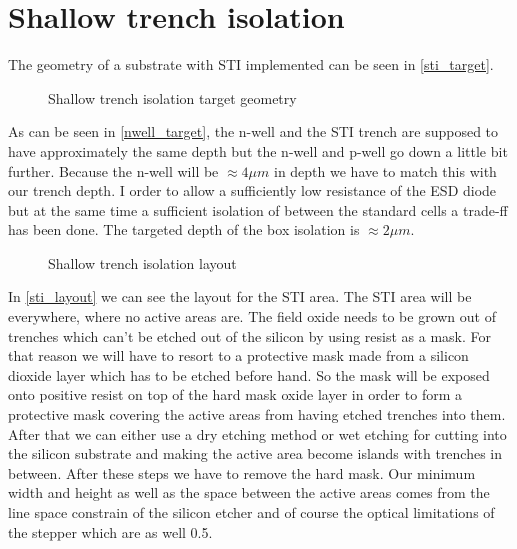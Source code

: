 \section{Shallow trench isolation}\label{sti_chapter}
The geometry of a substrate with STI implemented can be seen in \autoref{sti_target}.

\begin{figure}[H]
	\centering
	\begin{tikzpicture}[node distance = 3cm, auto, thick,scale=\CrossAndTopSectionBig, every node/.style={transform shape}]
		
	\end{tikzpicture}
	\begin{tikzpicture}[node distance = 3cm, auto, thick,scale=\CrossAndTopSectionBig, every node/.style={transform shape}]
		
	\end{tikzpicture}
	\caption{Shallow trench isolation target geometry}
	\label{sti_target}
\end{figure}

As can be seen in \autoref{nwell_target}, the n-well and the STI trench are supposed to have approximately the same depth but the n-well and p-well go down a little bit further.
Because the n-well will be $\approx 4 \mu m$ in depth we have to match this with our trench depth.
I order to allow a sufficiently low resistance of the ESD diode but at the same time a sufficient isolation of between the standard cells a trade-ff has been done.
The targeted depth of the box isolation is $\approx 2 \mu m$.

\begin{figure}[H]
	\centering
	\begin{tikzpicture}[node distance =1cm, auto, thick,scale=\VLSILayout, every node/.style={transform shape}]
		
	\end{tikzpicture}
	\caption{Shallow trench isolation layout}
	\label{sti_layout}
\end{figure}

In \autoref{sti_layout} we can see the layout for the STI area.
The STI area will be everywhere, where no active areas are.
The field oxide needs to be grown out of trenches which can't be etched out of the silicon by using resist as a mask.
For that reason we will have to resort to a protective mask made from a silicon dioxide layer which has to be etched before hand.
So the mask will be exposed onto positive resist on top of the hard mask oxide layer in order to form a protective mask covering the active areas from having etched trenches into them.
After that we can either use a dry etching method or wet etching for cutting into the silicon substrate and making the active area become islands with trenches in between.
After these steps we have to remove the hard mask.
Our minimum width and height as well as the space between the active areas comes from the line space constrain of the silicon etcher and of course the optical limitations of the stepper which are as well 0.5\um.


